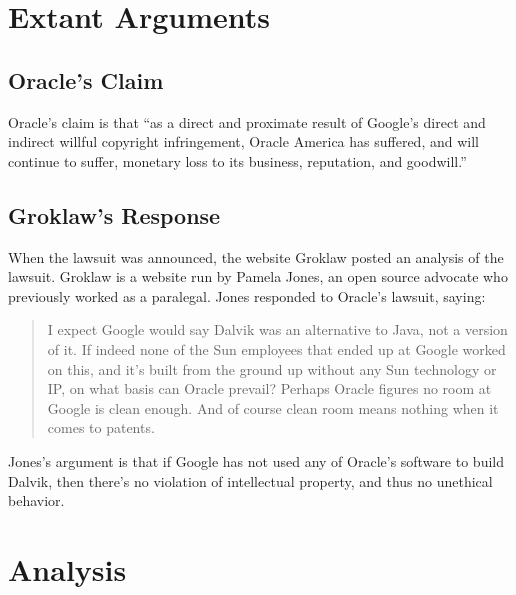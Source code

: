 \documentclass[11pt]{article}
\begin{document}
\begin{multicols}{2}

\section{Extant Arguments} %
\label{sec:args}

\subsection{Oracle's Claim} %
\label{sub:args_oracle}

Oracle's claim is that ``as a direct and proximate result of Google’s direct
and indirect willful copyright infringement, Oracle America has suffered, and
will continue to suffer, monetary loss to its business, reputation, and
goodwill.'' \cite[p.~9 line 11]{oracle-lawsuit}


\subsection{Groklaw's Response} %
\label{sub:args_groklaw}

When the lawsuit was announced, the website Groklaw posted an analysis of the
lawsuit.  Groklaw is a website run by Pamela Jones, an open source advocate who
previously worked as a paralegal. \cite{groklaw-pj} Jones responded to Oracle's
lawsuit, saying: \cite{groklaw}

\begin{quotation}
I expect Google would say Dalvik was an alternative to Java, not a version of
it. If indeed none of the Sun employees that ended up at Google worked on this,
and it's built from the ground up without any Sun technology or IP, on what
basis can Oracle prevail? Perhaps Oracle figures no room at Google is clean
enough. And of course clean room means nothing when it comes to patents.
\end{quotation}

Jones's argument is that if Google has not used any of Oracle's software to
build Dalvik, then there's no violation of intellectual property, and thus no
unethical behavior.



\section{Analysis} %
\label{sec:analysis}


\end{multicols}
\end{document}
